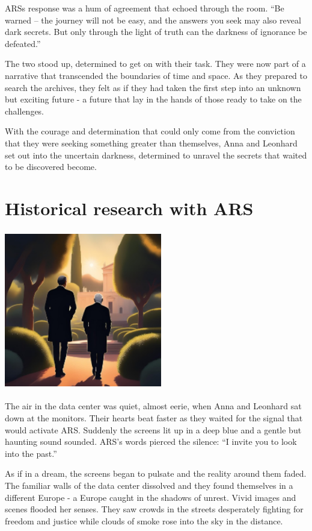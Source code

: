\documentclass[
]{article}
\begin{document}
ARS\textquotesingle s response was a hum of agreement that echoed
through the room. ``Be warned -- the journey will not be easy, and the
answers you seek may also reveal dark secrets. But only through the
light of truth can the darkness of ignorance be defeated.''

The two stood up, determined to get on with their task. They were now
part of a narrative that transcended the boundaries of time and space.
As they prepared to search the archives, they felt as if they had taken
the first step into an unknown but exciting future - a future that lay
in the hands of those ready to take on the challenges.

With the courage and determination that could only come from the
conviction that they were seeking something greater than themselves,
Anna and Leonhard set out into the uncertain darkness, determined to
unravel the secrets that waited to be discovered become.

\section{Historical research with
ARS}\label{historical-research-with-ars}

\includegraphics[width=2.70833in,height=2.72917in]{media/image1.png}

The air in the data center was quiet, almost eerie, when Anna and
Leonhard sat down at the monitors. Their hearts beat faster as they
waited for the signal that would activate ARS. Suddenly the screens lit
up in a deep blue and a gentle but haunting sound sounded. ARS's words
pierced the silence: ``I invite you to look into the past.''

As if in a dream, the screens began to pulsate and the reality around
them faded. The familiar walls of the data center dissolved and they
found themselves in a different Europe - a Europe caught in the shadows
of unrest. Vivid images and scenes flooded her senses. They saw crowds
in the streets desperately fighting for freedom and justice while clouds
of smoke rose into the sky in the distance.
\end{document}
